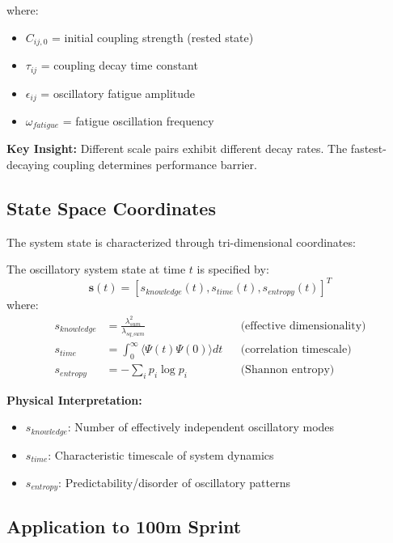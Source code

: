 where:
\begin{itemize}
\item $C_{ij,0}$ = initial coupling strength (rested state)
\item $\tau_{ij}$ = coupling decay time constant
\item $\epsilon_{ij}$ = oscillatory fatigue amplitude
\item $\omega_{fatigue}$ = fatigue oscillation frequency
\end{itemize}

\textbf{Key Insight:} Different scale pairs exhibit different decay rates. The fastest-decaying coupling determines performance barrier.

\subsection{State Space Coordinates}

The system state is characterized through tri-dimensional coordinates:

\begin{definition}
The oscillatory system state at time $t$ is specified by:
\begin{equation}
\mathbf{s}(t) = [s_{knowledge}(t), s_{time}(t), s_{entropy}(t)]^T
\label{eq:state_coordinates}
\end{equation}
where:
\begin{align}
s_{knowledge} &= \frac{\lambda_{sum}^2}{\lambda_{sq\_sum}} && \text{(effective dimensionality)} \label{eq:knowledge}\\
s_{time} &= \int_0^{\infty} \langle \Psi(t) \Psi(0) \rangle dt && \text{(correlation timescale)} \label{eq:time_dim}\\
s_{entropy} &= -\sum_i p_i \log p_i && \text{(Shannon entropy)} \label{eq:entropy_dim}
\end{align}
\end{definition}

\textbf{Physical Interpretation:}
\begin{itemize}
\item $s_{knowledge}$: Number of effectively independent oscillatory modes
\item $s_{time}$: Characteristic timescale of system dynamics
\item $s_{entropy}$: Predictability/disorder of oscillatory patterns
\end{itemize}

\subsection{Application to 100m Sprint}

